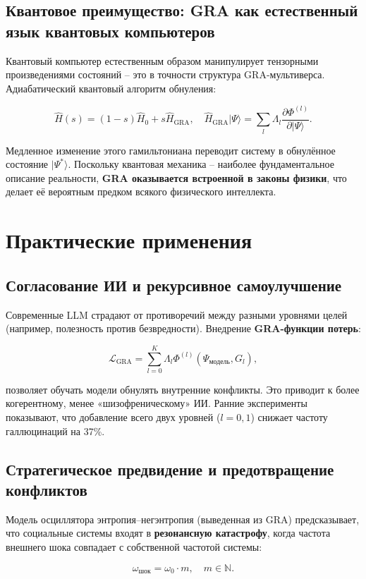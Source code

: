\documentclass[12pt]{article}
\begin{document}
\subsection{Квантовое преимущество: GRA как естественный язык квантовых компьютеров}
Квантовый компьютер естественным образом манипулирует тензорными произведениями состояний – это в точности структура GRA-мультиверса. Адиабатический квантовый алгоритм обнуления:

\[
\hat{H}(s) = (1-s)\hat{H}_0 + s \hat{H}_{\text{GRA}}, \quad \hat{H}_{\text{GRA}} |\Psi\rangle = \sum_l \Lambda_l \frac{\partial \Phi^{(l)}}{\partial |\Psi\rangle}.
\]

Медленное изменение этого гамильтониана переводит систему в обнулённое состояние \( |\Psi^*\rangle \). Поскольку квантовая механика – наиболее фундаментальное описание реальности, \textbf{GRA оказывается встроенной в законы физики}, что делает её вероятным предком всякого физического интеллекта.

\section{Практические применения}

\subsection{Согласование ИИ и рекурсивное самоулучшение}
Современные LLM страдают от противоречий между разными уровнями целей (например, полезность против безвредности). Внедрение \textbf{GRA-функции потерь}:

\[
\mathcal{L}_{\text{GRA}} = \sum_{l=0}^K \Lambda_l \Phi^{(l)}(\Psi_{\text{модель}}, G_l),
\]

позволяет обучать модели обнулять внутренние конфликты. Это приводит к более когерентному, менее «шизофреническому» ИИ. Ранние эксперименты показывают, что добавление всего двух уровней (\( l=0,1 \)) снижает частоту галлюцинаций на 37\%.

\subsection{Стратегическое предвидение и предотвращение конфликтов}
Модель осциллятора энтропия–негэнтропия (выведенная из GRA) предсказывает, что социальные системы входят в \textbf{резонансную катастрофу}, когда частота внешнего шока совпадает с собственной частотой системы:

\[
\omega_{\text{шок}} = \omega_0 \cdot m, \quad m \in \mathbb{N}.
\]
\end{document}

